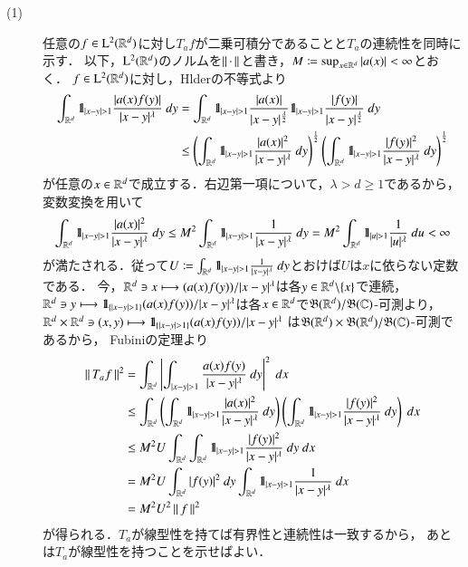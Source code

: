 	\begin{prf}\mbox{}
		\begin{description}
			\item[(1)] 
				任意の$f \in \mathrm{L}^2(\mathbb{R}^d)$に対し$T_a f$が二乗可積分であることと$T_a$の連続性を同時に示す．
				以下，$\mathrm{L}^2(\mathbb{R}^d)$のノルムを$\left\|\, \cdot\, \right\|_{}$と書き，$M \coloneqq \operatorname*{sup}_{x \in \mathbb{R}^d} |a(x)| < \infty$とおく．
				$f \in \mathrm{L}^2(\mathbb{R}^d)$に対し，Hlderの不等式より
				\begin{align}
					\int_{\mathbb{R}^d} \mbox{1}\hspace{-0.25em}\mbox{l}_{|x-y| > 1} \frac{|a(x)f(y)|}{|x-y|^\lambda}\ dy
					&= \int_{\mathbb{R}^d} \mbox{1}\hspace{-0.25em}\mbox{l}_{|x-y| > 1} \frac{|a(x)|}{|x-y|^{\frac{\lambda}{2}}} \mbox{1}\hspace{-0.25em}\mbox{l}_{|x-y| > 1} \frac{|f(y)|}{|x-y|^{\frac{\lambda}{2}}}\ dy \\
					&\leq \left( \int_{\mathbb{R}^d} \mbox{1}\hspace{-0.25em}\mbox{l}_{|x-y| > 1} \frac{|a(x)|^2}{|x-y|^{\lambda}}\ dy \right)^{\frac{1}{2}}
						\left( \int_{\mathbb{R}^d} \mbox{1}\hspace{-0.25em}\mbox{l}_{|x-y| > 1} \frac{|f(y)|^2}{|x-y|^{\lambda}}\ dy \right)^{\frac{1}{2}}
				\end{align}
				が任意の$x \in \mathbb{R}^d$で成立する．右辺第一項について，$\lambda > d \geq 1$であるから，変数変換を用いて
				\begin{align}
					\int_{\mathbb{R}^d} \mbox{1}\hspace{-0.25em}\mbox{l}_{|x-y| > 1} \frac{|a(x)|^2}{|x-y|^{\lambda}}\ dy
					\leq M^2 \int_{\mathbb{R}^d} \mbox{1}\hspace{-0.25em}\mbox{l}_{|x-y| > 1} \frac{1}{|x-y|^{\lambda}}\ dy
					= M^2 \int_{\mathbb{R}^d} \mbox{1}\hspace{-0.25em}\mbox{l}_{|u| > 1} \frac{1}{|u|^\lambda}\ du < \infty
				\end{align}
				が満たされる．従って$U \coloneqq \int_{\R^d} \defunc_{|x - y| > 1} \frac{1}{|x-y|^{\lambda}}\ dy$とおけば$U$は$x$に依らない定数である．
				今，$\mathbb{R}^d \ni x \longmapsto (a(x)f(y))/|x-y|^\lambda$は各$y \in \mathbb{R}^d \backslash \{x\}$で連続，
				$\R^d \ni y \longmapsto \defunc_{\left\{|x-y|>1\right\}}(a(x)f(y))/|x-y|^\lambda$は各$x \in \mathbb{R}^d$で$\mathfrak{B}(\mathbb{R}^d)/\mathfrak{B}(\mathbb{C})$-可測より，
				$\R^d \times \R^d \ni (x,y) \longmapsto \defunc_{\left\{|x-y|>1\right\}} (a(x)f(y))/|x-y|^\lambda$
				は$\mathfrak{B}(\mathbb{R}^d) \times \mathfrak{B}(\mathbb{R}^d)/\mathfrak{B}(\mathbb{C})$-可測であるから，
				Fubiniの定理より
				\begin{align}
					\left\|\, T_a f\, \right\|_{}^2
					&= \int_{\mathbb{R}^d} \left| \int_{|x-y| > 1} \frac{a(x)f(y)}{|x-y|^\lambda}\ dy \right|^2\ dx \\
					&\leq \int_{\mathbb{R}^d} \left( \int_{\mathbb{R}^d} \mbox{1}\hspace{-0.25em}\mbox{l}_{|x-y| > 1} \frac{|a(x)|^2}{|x-y|^{\lambda}}\ dy \right)
						\left( \int_{\mathbb{R}^d} \mbox{1}\hspace{-0.25em}\mbox{l}_{|x-y| > 1} \frac{|f(y)|^2}{|x-y|^{\lambda}}\ dy \right)\ dx \\
					&\leq M^2 U \int_{\mathbb{R}^d} \int_{\mathbb{R}^d} \mbox{1}\hspace{-0.25em}\mbox{l}_{|x-y| > 1} \frac{|f(y)|^2}{|x-y|^{\lambda}}\ dy\ dx \\
					&= M^2 U \int_{\mathbb{R}^d} |f(y)|^2\ dy \int_{\mathbb{R}^d} \mbox{1}\hspace{-0.25em}\mbox{l}_{|x-y| > 1} \frac{1}{|x-y|^{\lambda}}\ dx \\
					&= M^2 U^2 \left\|\, f\, \right\|_{}^2
					\label{eq:report_6_1}
 				\end{align}
 				が得られる．$T_a$が線型性を持てば有界性と連続性は一致するから，
 				あとは$T_a$が線型性を持つことを示せばよい．
 				

\end{description}
\end{prf}
